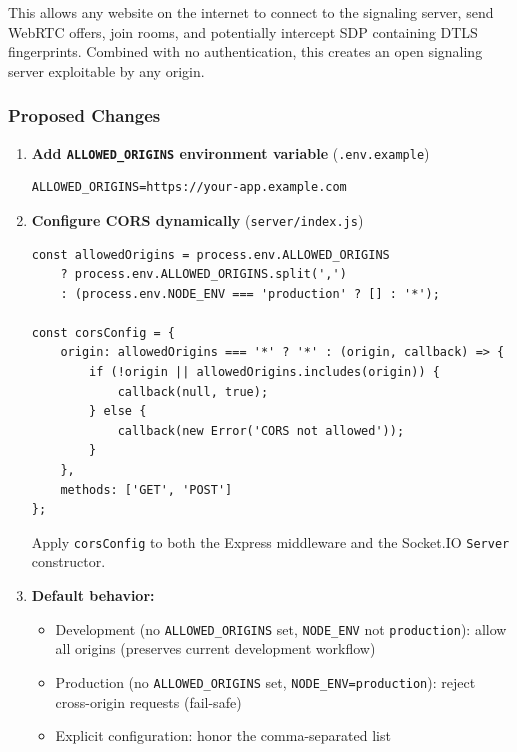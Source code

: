 \documentclass[11pt,letterpaper]{article}
\begin{document}
This allows any website on the internet to connect to the signaling server, send WebRTC offers, join rooms, and potentially intercept SDP containing DTLS fingerprints. Combined with no authentication, this creates an open signaling server exploitable by any origin.

\subsubsection{Proposed Changes}

\begin{enumerate}[leftmargin=2em]
    \item \textbf{Add \texttt{ALLOWED\_ORIGINS} environment variable} (\texttt{.env.example})

    \begin{verbatim}
ALLOWED_ORIGINS=https://your-app.example.com
    \end{verbatim}

    \item \textbf{Configure CORS dynamically} (\texttt{server/index.js})

    \begin{verbatim}
const allowedOrigins = process.env.ALLOWED_ORIGINS
    ? process.env.ALLOWED_ORIGINS.split(',')
    : (process.env.NODE_ENV === 'production' ? [] : '*');

const corsConfig = {
    origin: allowedOrigins === '*' ? '*' : (origin, callback) => {
        if (!origin || allowedOrigins.includes(origin)) {
            callback(null, true);
        } else {
            callback(new Error('CORS not allowed'));
        }
    },
    methods: ['GET', 'POST']
};
    \end{verbatim}

    Apply \texttt{corsConfig} to both the Express middleware and the Socket.IO \texttt{Server} constructor.

    \item \textbf{Default behavior:}
    \begin{itemize}
        \item Development (no \texttt{ALLOWED\_ORIGINS} set, \texttt{NODE\_ENV} not \texttt{production}): allow all origins (preserves current development workflow)
        \item Production (no \texttt{ALLOWED\_ORIGINS} set, \texttt{NODE\_ENV=production}): reject cross-origin requests (fail-safe)
        \item Explicit configuration: honor the comma-separated list
    \end{itemize}
\end{enumerate}
\end{document}

